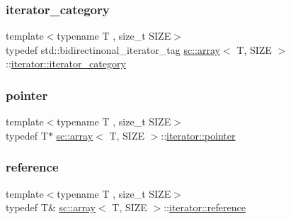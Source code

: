 \subsubsection{\texorpdfstring{iterator\+\_\+category}{iterator\_category}}
{\footnotesize\ttfamily template$<$typename T , size\+\_\+t S\+I\+ZE$>$ \\
typedef std\+::bidirectinonal\+\_\+iterator\+\_\+tag \hyperlink{classsc_1_1array}{sc\+::array}$<$ T, S\+I\+ZE $>$\+::\hyperlink{classsc_1_1array_1_1iterator_a75eb4a75d259d12310f3be4d16e8a7b9}{iterator\+::iterator\+\_\+category}}

\mbox{\label{classsc_1_1array_1_1iterator_a1b59529d09bbd80445a8d931b102dbe0}} 
\subsubsection{\texorpdfstring{pointer}{pointer}}
{\footnotesize\ttfamily template$<$typename T , size\+\_\+t S\+I\+ZE$>$ \\
typedef T$\ast$ \hyperlink{classsc_1_1array}{sc\+::array}$<$ T, S\+I\+ZE $>$\+::\hyperlink{classsc_1_1array_1_1iterator_a1b59529d09bbd80445a8d931b102dbe0}{iterator\+::pointer}}

\mbox{\label{classsc_1_1array_1_1iterator_a8015b13eb5e649591e3b0265546a0201}} 
\subsubsection{\texorpdfstring{reference}{reference}}
{\footnotesize\ttfamily template$<$typename T , size\+\_\+t S\+I\+ZE$>$ \\
typedef T\& \hyperlink{classsc_1_1array}{sc\+::array}$<$ T, S\+I\+ZE $>$\+::\hyperlink{classsc_1_1array_1_1iterator_a8015b13eb5e649591e3b0265546a0201}{iterator\+::reference}}

\mbox{\label{classsc_1_1array_1_1iterator_aeec0cf52de962a18d79cdbcdfe74be92}} 
